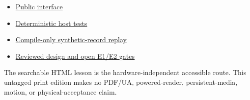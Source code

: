 \documentclass[11pt]{article}
\begin{document}
\begin{itemize}
 \item \href{https://github.com/spincyc/adk/blob/main/src/local_identity_registry.h}
       {Public interface}
 \item \href{https://github.com/spincyc/adk/blob/main/tests/test_local_identity_registry.cpp}
       {Deterministic host tests}
 \item \href{https://github.com/spincyc/adk/blob/main/examples/Lesson049LocalIdentityRegistry/Lesson049LocalIdentityRegistry.ino}
       {Compile-only synthetic-record replay}
 \item \href{https://github.com/spincyc/adk/blob/main/docs/design/LESSONS_049_051_PARTS_CAROUSEL_PLAN.md}
       {Reviewed design and open E1/E2 gates}
\end{itemize}

The searchable HTML lesson is the hardware-independent accessible route.
This untagged print edition makes no PDF/UA, powered-reader, persistent-media,
motion, or physical-acceptance claim.
\end{document}
